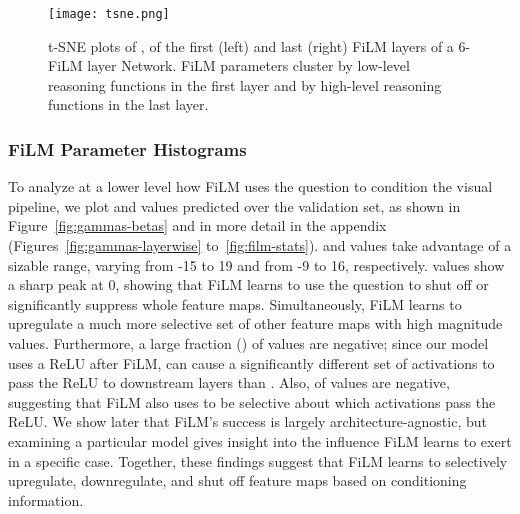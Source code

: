 \documentclass[letterpaper]{article} \usepackage{aaai18}  \usepackage{times}  \usepackage{helvet}  \usepackage{courier}  \usepackage{url}  \usepackage{graphicx}  \frenchspacing  \setlength{\pdfpagewidth}{8.5in}  \setlength{\pdfpageheight}{11in}
\begin{document}
        \begin{figure*}[t]
        \centering
        \texttt{[image: tsne.png]}
        \caption{t-SNE plots of ,  of the first (left) and last (right) FiLM layers of a 6-FiLM layer Network. FiLM parameters cluster by low-level reasoning functions in the first layer and by high-level reasoning functions in the last layer.}
        \label{fig:tsne}
        \end{figure*}
        
        \subsubsection{FiLM Parameter Histograms}
		To analyze at a lower level how FiLM uses the question to condition the visual pipeline, we plot  and  values predicted over the validation set, as shown in Figure~\ref{fig:gammas-betas} and in more detail in the appendix (Figures~\ref{fig:gammas-layerwise} to~\ref{fig:film-stats}).  and  values take advantage of a sizable range, varying from -15 to 19 and from -9 to 16, respectively.  values show a sharp peak at 0, showing that FiLM learns to use the question to shut off or significantly suppress whole feature maps. Simultaneously, FiLM learns to upregulate a much more selective set of other feature maps with high magnitude  values. Furthermore, a large fraction () of  values are negative; since our model uses a ReLU after FiLM,  can cause a significantly different set of activations to pass the ReLU to downstream layers than . Also,  of  values are negative, suggesting that FiLM also uses  to be selective about which activations pass the ReLU. We show later that FiLM's success is largely architecture-agnostic, but examining a particular model gives insight into the influence FiLM learns to exert in a specific case. Together, these findings suggest that FiLM learns to selectively upregulate, downregulate, and shut off feature maps based on conditioning information.
        
\end{document}
